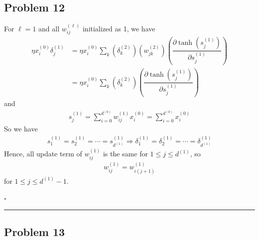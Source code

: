 \documentclass[12pt]{article}
\newcommand*{\QEDB}{\hfill\ensuremath{\square}}
\newcommand{\ParTh}[1]{\left(#1\right)}
\newcommand{\horrule}[1]{\rule{\linewidth}{#1}}
\begin{document}
\subsection*{Problem 12}

For $\ell=1$ and all $w^{\ParTh{\ell}}_{ij}$ initialized as 1, we have
\begin{align}
\eta x^{\ParTh{0}}_i\delta^{\ParTh{1}}_j&=\eta x^{\ParTh{0}}_i\sum_{k}\ParTh{\delta^{\ParTh{2}}_k}\ParTh{w^{\ParTh{2}}_{jk}}\ParTh{\dfrac{\partial\tanh\ParTh{s^{\ParTh{1}}_j}}{\partial s^{\ParTh{1}}_j}}\\
&=\eta x^{\ParTh{0}}_i\sum_{k}\ParTh{\delta^{\ParTh{2}}_k}\ParTh{\dfrac{\partial\tanh\ParTh{s^{\ParTh{1}}_j}}{\partial s^{\ParTh{1}}_j}}
\end{align}
and
\begin{align}
s^{\ParTh{1}}_j=\sum_{i=0}^{d^{\ParTh{0}}}w^{\ParTh{1}}_{ij}x^{\ParTh{0}}_i=\sum_{i=0}^{d^{\ParTh{0}}}x^{\ParTh{0}}_i
\end{align}
So we have
\begin{align}
s^{\ParTh{1}}_1=s^{\ParTh{1}}_2=\cdots=s^{\ParTh{1}}_{d^{\ParTh{1}}}\Rightarrow\delta^{\ParTh{1}}_1=\delta^{\ParTh{1}}_2=\cdots=\delta^{\ParTh{1}}_{d^{\ParTh{1}}}
\end{align}
Hence, all update term of $w^{\ParTh{1}}_{ij}$ is the same for $1\leq j\leq d^{\ParTh{1}}$, so
\begin{align}
w^{\ParTh{1}}_{ij}=w^{\ParTh{1}}_{i\ParTh{j+1}}
\end{align}
for $1\leq j\leq d^{\ParTh{1}}-1$.

\QEDB

\horrule{0.5pt}

\subsection*{Problem 13}
\end{document}
